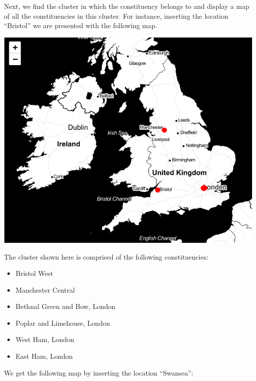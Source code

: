 \documentclass[a4paper, 11pt]{article}
\begin{document}
\qquad Next, we find the cluster in which the constituency belongs to and display a map of all the constituencies in this cluster. For instance, inserting the location ``Bristol'' we are presented with the following map.

\begin{center}
  \includegraphics[scale=.40]{../gfx/map0.png}
\end{center}

The cluster shown here is comprised of the following constituencies:
\begin{itemize}
  \item Bristol West
  \item Manchester Central
  \item Bethnal Green and Bow, London
  \item Poplar and Limehouse, London
  \item West Ham, London
  \item East Ham, London\\
\end{itemize}

We get the following map by inserting the location ``Swansea'':
\end{document}
